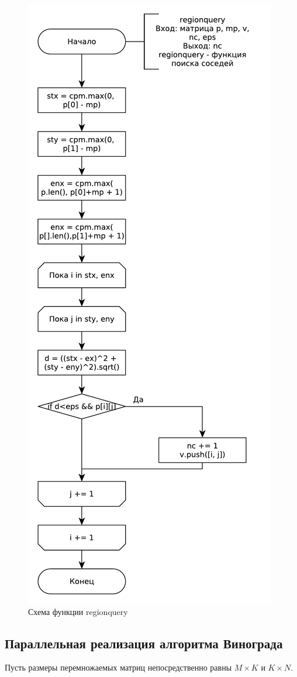 \begin{figure}[ht!]
	\centering
	\includegraphics[width=0.5\linewidth]{assets/graphs/regionquery.pdf}
	\caption{Схема функции regionquery}
	\label{fig:alg2}
\end{figure}

\subsection{Параллельная реализация алгоритма Винограда}


Пусть размеры перемножаемых матриц непосредственно равны $M \times K$ и $K \times N$.


